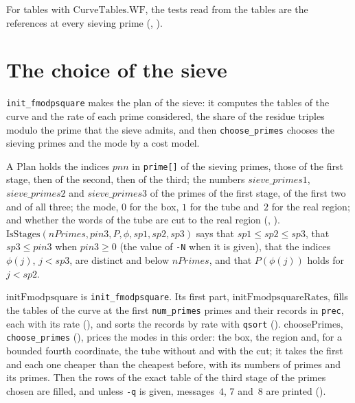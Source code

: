 For tables with $\mathrm{CurveTables.WF}$, the tests read from the tables are the references at
every sieving prime (,
).

\section{The choice of the sieve}\label{sec:sieveChoice}

\texttt{init\_fmodpsquare} makes the plan of the sieve: it computes the tables of the curve and the
rate of each prime considered, the share of the residue triples modulo the prime that the sieve
admits, and then \texttt{choose\_primes} chooses the sieving primes and the mode by a cost model.

\begin{definition}\label{def:Plan}
  \leanok
  A $\mathrm{Plan}$ holds the indices $\mathit{pnn}$ in \texttt{prime[]} of the sieving primes,
  those of the first stage, then of the second, then of the third; the numbers
  $\mathit{sieve\_primes1}$, $\mathit{sieve\_primes2}$ and $\mathit{sieve\_primes3}$ of the primes
  of the first stage, of the first two and of all three; the mode, $0$ for the box, $1$ for the tube
  and~$2$ for the real region; and whether the words of the tube are cut to the real region
  (, ).
  $\mathrm{IsStages}(\mathit{nPrimes}, \mathit{pin3}, P, \phi, \mathit{sp1}, \mathit{sp2},
  \mathit{sp3})$ says that $\mathit{sp1} \le \mathit{sp2} \le \mathit{sp3}$, that
  $\mathit{sp3} \le \mathit{pin3}$ when $\mathit{pin3} \ge 0$ (the value of \texttt{-N} when it is
  given), that the indices $\phi(j)$, $j < \mathit{sp3}$, are distinct and below $\mathit{nPrimes}$,
  and that $P(\phi(j))$ holds for $j < \mathit{sp2}$.
\end{definition}

\begin{definition}\label{def:initFmodpsquare}
  \leanok
  $\mathrm{initFmodpsquare}$ is \texttt{init\_fmodpsquare}. Its first part,
  $\mathrm{initFmodpsquareRates}$, fills the tables of the curve at the first \texttt{num\_primes}
  primes and their records in \texttt{prec}, each with its rate (), and
  sorts the records by rate with \texttt{qsort} (). $\mathrm{choosePrimes}$, \texttt{choose\_primes}
  (), prices the modes in this order: the box, the region and, for a
  bounded fourth coordinate, the tube without and with the cut; it takes the first and each one
  cheaper than the cheapest before, with its numbers of primes and its primes. Then the rows of the
  exact table of the third stage of the primes chosen are filled, and unless \texttt{-q} is given,
  messages~$4$, $7$ and~$8$ are printed ().
\end{definition}

